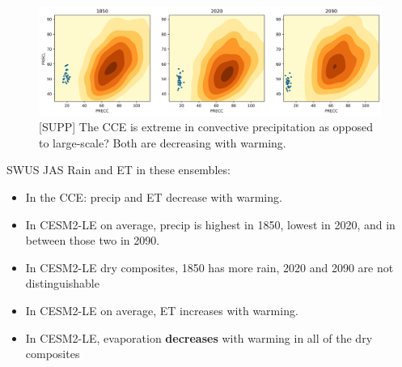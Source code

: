 \documentclass[11pt]{article}
\begin{document}
\begin{figure}[h]
\centering
\includegraphics[width=40pc]{figs/contours/PRECC_PRECL_contours.png}
\caption{[SUPP] The CCE is extreme in convective precipitation as opposed to large-scale? Both are decreasing with warming.}
\label{fig:precip}
\end{figure}

\clearpage
SWUS JAS Rain and ET in these ensembles:
\begin{itemize}
    \item In the CCE: precip and ET decrease with warming.
    \item In CESM2-LE on average, precip is highest in 1850, lowest in 2020, and in between those two in 2090.
    \item In CESM2-LE dry composites, 1850 has more rain, 2020 and 2090 are not distinguishable
    \item In CESM2-LE on average, ET increases with warming.
    \item In CESM2-LE, evaporation \textbf{decreases} with warming in all of the dry composites    
\end{itemize}


\nocite{*}

\end{document}
